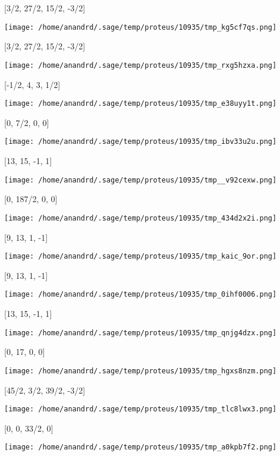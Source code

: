 \documentclass[11pt]{article}
\begin{document}
[3/2, 27/2, 15/2, -3/2]
\begin{center}
\texttt{[image: /home/anandrd/.sage/temp/proteus/10935/tmp\_kg5cf7qs.png]}
\end{center}
[3/2, 27/2, 15/2, -3/2]
\begin{center}
\texttt{[image: /home/anandrd/.sage/temp/proteus/10935/tmp\_rxg5hzxa.png]}
\end{center}
[-1/2, 4, 3, 1/2]
\begin{center}
\texttt{[image: /home/anandrd/.sage/temp/proteus/10935/tmp\_e38uyy1t.png]}
\end{center}
[0, 7/2, 0, 0]
\begin{center}
\texttt{[image: /home/anandrd/.sage/temp/proteus/10935/tmp\_ibv33u2u.png]}
\end{center}
[13, 15, -1, 1]
\begin{center}
\texttt{[image: /home/anandrd/.sage/temp/proteus/10935/tmp\_\_v92cexw.png]}
\end{center}
[0, 187/2, 0, 0]
\begin{center}
\texttt{[image: /home/anandrd/.sage/temp/proteus/10935/tmp\_434d2x2i.png]}
\end{center}
[9, 13, 1, -1]
\begin{center}
\texttt{[image: /home/anandrd/.sage/temp/proteus/10935/tmp\_kaic\_9or.png]}
\end{center}
[9, 13, 1, -1]
\begin{center}
\texttt{[image: /home/anandrd/.sage/temp/proteus/10935/tmp\_0ihf0006.png]}
\end{center}
[13, 15, -1, 1]
\begin{center}
\texttt{[image: /home/anandrd/.sage/temp/proteus/10935/tmp\_qnjg4dzx.png]}
\end{center}
[0, 17, 0, 0]
\begin{center}
\texttt{[image: /home/anandrd/.sage/temp/proteus/10935/tmp\_hgxs8nzm.png]}
\end{center}
[45/2, 3/2, 39/2, -3/2]
\begin{center}
\texttt{[image: /home/anandrd/.sage/temp/proteus/10935/tmp\_tlc8lwx3.png]}
\end{center}
[0, 0, 33/2, 0]
\begin{center}
\texttt{[image: /home/anandrd/.sage/temp/proteus/10935/tmp\_a0kpb7f2.png]}
\end{center}
\end{document}
